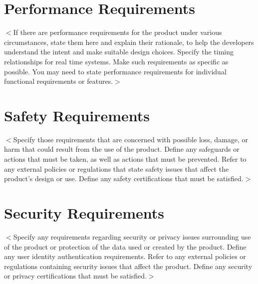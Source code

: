 \documentclass{scrreprt}
\begin{document}
\begin{CJK}{UTF8}{bkai}
\section{Performance Requirements}
$<$If there are performance requirements for the product under various 
circumstances, state them here and explain their rationale, to help the 
developers understand the intent and make suitable design choices. Specify the 
timing relationships for real time systems. Make such requirements as specific 
as possible. You may need to state performance requirements for individual 
functional requirements or features.$>$

\section{Safety Requirements}
$<$Specify those requirements that are concerned with possible loss, damage, or 
harm that could result from the use of the product. Define any safeguards or 
actions that must be taken, as well as actions that must be prevented. Refer to 
any external policies or regulations that state safety issues that affect the 
product’s design or use. Define any safety certifications that must be 
satisfied.$>$

\section{Security Requirements}
$<$Specify any requirements regarding security or privacy issues surrounding use 
of the product or protection of the data used or created by the product. Define 
any user identity authentication requirements. Refer to any external policies or 
regulations containing security issues that affect the product. Define any 
security or privacy certifications that must be satisfied.$>$

\end{CJK}
\end{document}
